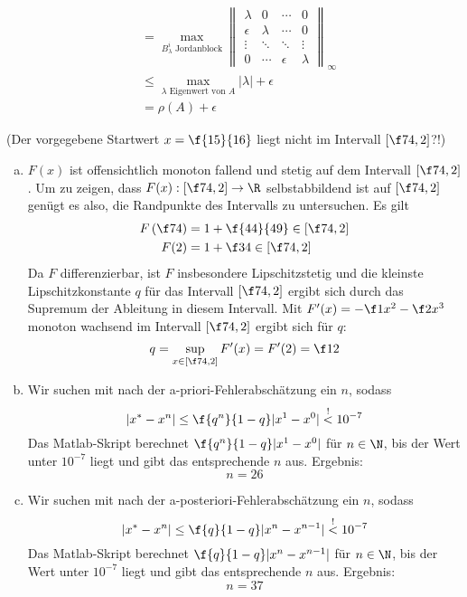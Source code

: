 \documentclass{scrartcl}
\begin{document}
\begin{aufgabe}
\begin{enumerate}[a)]
\begin{align*}
										&= \max_{B_\lambda^i \text{ Jordanblock}}\left\|\begin{matrix}\lambda & 0 & \cdots & 0\\ \epsilon & \lambda & \cdots & 0\\ \vdots & \ddots & \ddots & \vdots\\0&\cdots & \epsilon & \lambda\end{matrix}\right\|_\infty\\
						 &\le \max_{\lambda \text{ Eigenwert von $A$}}|\lambda| + \epsilon\\
					  &=\rho(A) + \epsilon
				\end{align*}
		\end{enumerate}
	\end{aufgabe}

	\begin{aufgabe}
		(Der vorgegebene Startwert $x=\f {15}{16}$ liegt nicht im Intervall $[\f74,2]$?!)
		\begin{enumerate}[a)]
			\item
				$F(x)$ ist offensichtlich monoton fallend und stetig auf dem Intervall $[\f74,2]$.
				Um zu zeigen, dass $F(x):[\f74,2]\to \R$ selbstabbildend ist auf $[\f74,2]$ genügt es also, die Randpunkte des Intervalls zu untersuchen.
				Es gilt
				\begin{align*}
					F\left(\f74\right) &= 1 + \f{44}{49} \in \left[\f74,2\right]\\
					   F(2) &= 1 + \f34 \in \left[\f74,2\right]
				\end{align*}
				Da $F$ differenzierbar, ist $F$ insbesondere Lipschitzstetig und die kleinste Lipschitzkonstante $q$ für das Intervall $[\f74,2]$ ergibt sich durch das Supremum der Ableitung in diesem Intervall.
				Mit $F'(x) = -\f1{x^2} - \f2{x^3}$ monoton wachsend im Intervall $[\f74,2]$ ergibt sich für $q$:
				\[
					q = \sup_{x\in[\f74,2]}F'(x) = F'(2) = \f12
				\]
			\item
				Wir suchen mit nach der a-priori-Fehlerabschätzung ein $n$, sodass
				\[
					|x^*-x^n| \le \f{q^n}{1-q}|x^1-x^0| \stackrel !< 10^{-7}
				\]
				Das Matlab-Skript berechnet $\f{q^n}{1-q}|x^1-x^0|$ für $n\in \N$, bis der Wert unter $10^{-7}$ liegt und gibt das entsprechende $n$ aus.
				Ergebnis:
				\[
					n=26
				\]
			\item
				Wir suchen mit nach der a-posteriori-Fehlerabschätzung ein $n$, sodass
				\[
					|x^*-x^n| \le \f{q}{1-q}|x^n-x^{n-1}| \stackrel !< 10^{-7}
				\]
				Das Matlab-Skript berechnet $\f{q}{1-q}|x^n-x^{n-1}|$ für $n\in \N$, bis der Wert unter $10^{-7}$ liegt und gibt das entsprechende $n$ aus.
				Ergebnis:
				\[
					n=37
				\]


		\end{enumerate}

	\end{aufgabe}
\end{document}
